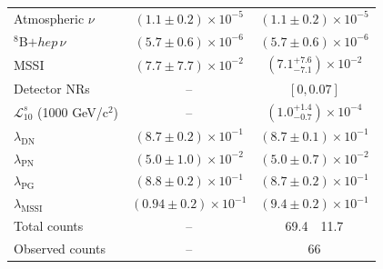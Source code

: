 \begin{table}[ht]
\begin{tabular}{l
            r@{$\,\pm\,$}l
            r@{$\,\pm\,$}l}
     Atmospheric $\nu$               & \multicolumn{2}{c}{$(1.1 \pm 0.2) \times 10^{-5}$} & \multicolumn{2}{c}{$(1.1 \pm 0.2) \times 10^{-5}$} \\
     $^{8}$B$+hep\,\nu$              & \multicolumn{2}{c}{$(5.7 \pm 0.6) \times 10^{-6}$} & \multicolumn{2}{c}{$(5.7 \pm 0.6) \times 10^{-6}$} \\
     MSSI                            & \multicolumn{2}{c}{$(7.7 \pm 7.7) \times 10^{-2}$} & \multicolumn{2}{c}{$(7.1^{+7.6}_{-7.1}) \times 10^{-2}$} \\
     Detector NRs                    & \multicolumn{2}{c}{--} & \multicolumn{2}{c}{$[0, 0.07]$}  $\,\,\,\,\,\,\,\,\,\,$\\
     $\mathcal{L}_{10}^s$ (1000 GeV/c$^2$)                & \multicolumn{2}{c}{--} & \multicolumn{2}{c}{$\left(1.0^{+1.4}_{-0.7}\right) \times 10^{-4}$} \\
     \hline
     $\lambda_{\text{DN}}$           & \multicolumn{2}{c}{$(8.7 \pm 0.2) \times 10^{-1}$} & \multicolumn{2}{c}{$(8.7 \pm 0.1) \times 10^{-1}$} \\
     $\lambda_{\text{PN}}$           & \multicolumn{2}{c}{$(5.0 \pm 1.0) \times 10^{-2}$} & \multicolumn{2}{c}{$(5.0 \pm 0.7) \times 10^{-2}$} \\
     
     $\lambda_{\text{PG}}$           & \multicolumn{2}{c}{$(8.8 \pm 0.2) \times 10^{-1}$} & \multicolumn{2}{c}{$\left(8.7 \pm 0.2\right) \times 10^{-1}$} \\
     $\lambda_{\text{MSSI}}$         & \multicolumn{2}{c}{$(0.94 \pm 0.2) \times 10^{-1}$} & \multicolumn{2}{c}{$(9.4 \pm 0.2) \times 10^{-1}$} \\
     \hline
     \hline
     Total counts                    & \multicolumn{2}{c}{--} & 69.4 & 11.7 \\
     \hline
     Observed counts                 & \multicolumn{2}{c}{--} & \multicolumn{2}{c}{66} $\,\,\,\,\,\,\,\,\,$\\
     \hline \hline
    \end{tabular}
    \label{tab:prompt_sample_fit_table} 
\end{table}

